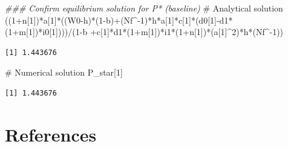 \documentclass[
  letterpaper,
  DIV=11,
  numbers=noendperiod]{scrreprt}
\newenvironment{Shaded}{\begin{snugshade}}{\end{snugshade}}
\newcommand{\CommentTok}[1]{\textcolor[rgb]{0.37,0.37,0.37}{#1}}
\newcommand{\DecValTok}[1]{\textcolor[rgb]{0.68,0.00,0.00}{#1}}
\newcommand{\DocumentationTok}[1]{\textcolor[rgb]{0.37,0.37,0.37}{\textit{#1}}}
\newcommand{\NormalTok}[1]{\textcolor[rgb]{0.00,0.23,0.31}{#1}}
\newcommand{\SpecialCharTok}[1]{\textcolor[rgb]{0.37,0.37,0.37}{#1}}
\begin{document}
\begin{Shaded}
\begin{Highlighting}[]
\DocumentationTok{\#\#\# Confirm equilibrium solution for P*  (baseline)}
\CommentTok{\# Analytical solution}
\NormalTok{((}\DecValTok{1}\SpecialCharTok{+}\NormalTok{n[}\DecValTok{1}\NormalTok{])}\SpecialCharTok{*}\NormalTok{a[}\DecValTok{1}\NormalTok{]}\SpecialCharTok{*}\NormalTok{((W0}\SpecialCharTok{{-}}\NormalTok{h)}\SpecialCharTok{*}\NormalTok{(}\DecValTok{1}\SpecialCharTok{{-}}\NormalTok{b)}\SpecialCharTok{+}\NormalTok{(Nf}\SpecialCharTok{\^{}{-}}\DecValTok{1}\NormalTok{)}\SpecialCharTok{*}\NormalTok{h}\SpecialCharTok{*}\NormalTok{a[}\DecValTok{1}\NormalTok{]}\SpecialCharTok{*}\NormalTok{c[}\DecValTok{1}\NormalTok{]}\SpecialCharTok{*}\NormalTok{(d0[}\DecValTok{1}\NormalTok{]}\SpecialCharTok{{-}}\NormalTok{d1}\SpecialCharTok{*}\NormalTok{(}\DecValTok{1}\SpecialCharTok{+}\NormalTok{m[}\DecValTok{1}\NormalTok{])}\SpecialCharTok{*}\NormalTok{i0[}\DecValTok{1}\NormalTok{])))}\SpecialCharTok{/}\NormalTok{(}\DecValTok{1}\SpecialCharTok{{-}}\NormalTok{b }\SpecialCharTok{+}\NormalTok{c[}\DecValTok{1}\NormalTok{]}\SpecialCharTok{*}\NormalTok{d1}\SpecialCharTok{*}\NormalTok{(}\DecValTok{1}\SpecialCharTok{+}\NormalTok{m[}\DecValTok{1}\NormalTok{])}\SpecialCharTok{*}\NormalTok{i1}\SpecialCharTok{*}\NormalTok{(}\DecValTok{1}\SpecialCharTok{+}\NormalTok{n[}\DecValTok{1}\NormalTok{])}\SpecialCharTok{*}\NormalTok{(a[}\DecValTok{1}\NormalTok{]}\SpecialCharTok{\^{}}\DecValTok{2}\NormalTok{)}\SpecialCharTok{*}\NormalTok{h}\SpecialCharTok{*}\NormalTok{(Nf}\SpecialCharTok{\^{}{-}}\DecValTok{1}\NormalTok{))}
\end{Highlighting}
\end{Shaded}

\begin{verbatim}
[1] 1.443676
\end{verbatim}

\begin{Shaded}
\begin{Highlighting}[]
\CommentTok{\# Numerical solution}
\NormalTok{P\_star[}\DecValTok{1}\NormalTok{]}
\end{Highlighting}
\end{Shaded}

\begin{verbatim}
[1] 1.443676
\end{verbatim}

\section*{References}\label{references-4}
\end{document}
